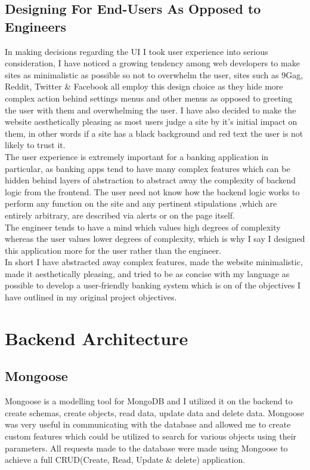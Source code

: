 \subsection{Designing For End-Users As Opposed to Engineers}
In making decisions regarding the UI I took user experience into serious consideration,
I have noticed a growing tendency among web developers to make sites as minimalistic as
possible so not to overwhelm the user, sites such as 9Gag, Reddit, Twitter \& Facebook
all employ this design choice as they hide more complex action behind settings menus
and other menus as opposed to greeting the user with them and overwhelming the user.  I have also decided to
make the website aesthetically pleasing as most users judge a site by it's initial
impact on them, in other words if a site has a black background and red text the user
is not likely to trust it.
\\
The user experience is extremely important for a banking application in particular,
as banking apps tend to have many complex features which can be hidden behind layers
of abstraction to abstract away the complexity of backend logic from the frontend.
The user need not know how the backend logic works to perform any function on the
site and any pertinent stipulations ,which are entirely arbitrary, are described via
alerts or on the page itself.
\\
The engineer tends to have a mind which values high degrees of complexity whereas
the user values lower degrees of complexity, which is why I say I designed this
application more for the user rather than the engineer.
\\
In short I have abstracted away complex features, made the website minimalistic,
made it aesthetically pleasing, and tried to be as concise with my language as
possible to develop a user-friendly banking system which is on of the objectives
I have outlined in my original project objectives.
\section{Backend Architecture}
\subsection{Mongoose}
Mongoose is a modelling tool for MongoDB and I utilized it on the backend to create schemas, create objects, read data, update data and delete data. Mongoose was very useful in communicating with the database and allowed me to create custom features which could be utilized to search for various objects using their parameters.  All requests made to the database were made using Mongoose to achieve a full CRUD(Create, Read, Update \& delete) application.
